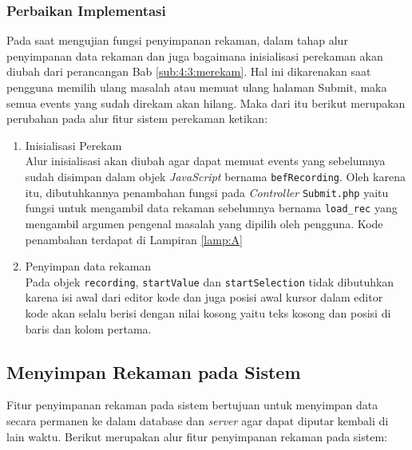 \subsubsection{Perbaikan Implementasi}

Pada saat mengujian fungsi penyimpanan rekaman, dalam tahap alur penyimpanan data rekaman dan juga bagaimana inisialisasi perekaman akan diubah dari perancangan Bab \ref{sub:4:3:merekam}. Hal ini dikarenakan saat pengguna memilih ulang masalah atau memuat ulang halaman Submit, maka semua events yang sudah direkam akan hilang. Maka dari itu berikut merupakan perubahan pada alur fitur sistem perekaman ketikan:

\begin{enumerate}
    \item Inisialisasi Perekam \\
    Alur inisialisasi akan diubah agar dapat memuat events yang sebelumnya sudah disimpan dalam objek \textit{JavaScript} bernama \verb|befRecording|. Oleh karena itu, dibutuhkannya penambahan fungsi pada \textit{Controller} \verb|Submit.php| yaitu fungsi untuk mengambil data rekaman sebelumnya bernama \verb|load_rec| yang mengambil argumen pengenal masalah yang dipilih oleh pengguna. Kode penambahan terdapat di Lampiran \ref{lamp:A}

    \item Penyimpan data rekaman \\
    Pada objek \verb|recording|, \verb|startValue| dan \verb|startSelection| tidak dibutuhkan karena isi awal dari editor kode dan juga posisi awal kursor dalam editor kode akan selalu berisi dengan nilai kosong yaitu teks kosong dan posisi di baris dan kolom pertama.
\end{enumerate}

\subsection{Menyimpan Rekaman pada Sistem}
\label{sub:5:2:storerekaman}

Fitur penyimpanan rekaman pada sistem bertujuan untuk menyimpan data secara permanen ke dalam database dan \textit{server} agar dapat diputar kembali di lain waktu. Berikut merupakan alur fitur penyimpanan rekaman pada sistem:


